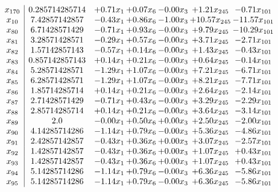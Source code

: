 \documentclass[8pt]{article}
\begin{document}
\[\begin{array}{c| c c@{\hskip 2pt} c@{\hskip 2pt} c@{\hskip 2pt} c@{\hskip 2pt} c@{\hskip 2pt} }
 x_{170}   &  0.285714285714 & +  0.71 x_{1} & +  0.07 x_{6} & -0.00 x_{3} & +  1.21 x_{245} & -0.71 x_{101}\\
 x_{10}   &  7.42857142857 & -0.43 x_{1} & +  0.86 x_{6} & -1.00 x_{3} & + 10.57 x_{245} & -11.57 x_{101}\\
 x_{80}   &  6.71428571429 & -0.71 x_{1} & +  0.93 x_{6} & -0.00 x_{3} & +  9.79 x_{245} & -10.29 x_{101}\\
 x_{81}   &  3.28571428571 & -0.29 x_{1} & +  0.57 x_{6} & -0.00 x_{3} & +  3.71 x_{245} & -2.71 x_{101}\\
 x_{82}   &  1.57142857143 & -0.57 x_{1} & +  0.14 x_{6} & -0.00 x_{3} & +  1.43 x_{245} & -0.43 x_{101}\\
 x_{83}   &  0.857142857143 & +  0.14 x_{1} & +  0.21 x_{6} & -0.00 x_{3} & +  0.64 x_{245} & -0.14 x_{101}\\
 x_{84}   &  5.28571428571 & -1.29 x_{1} & +  1.07 x_{6} & -0.00 x_{3} & +  7.21 x_{245} & -6.71 x_{101}\\
 x_{85}   &  6.28571428571 & -1.29 x_{1} & +  1.07 x_{6} & -0.00 x_{3} & +  8.21 x_{245} & -7.71 x_{101}\\
 x_{86}   &  1.85714285714 & +  0.14 x_{1} & +  0.21 x_{6} & -0.00 x_{3} & +  2.64 x_{245} & -2.14 x_{101}\\
 x_{87}   &  2.71428571429 & -0.71 x_{1} & +  0.43 x_{6} & -0.00 x_{3} & +  3.29 x_{245} & -2.29 x_{101}\\
 x_{88}   &  2.85714285714 & +  0.14 x_{1} & +  0.21 x_{6} & -0.00 x_{3} & +  3.64 x_{245} & -3.14 x_{101}\\
 x_{89}   &  2.0 & -0.00 x_{1} & +  0.50 x_{6} & +  0.00 x_{3} & +  2.50 x_{245} & -2.00 x_{101}\\
 x_{90}   &  4.14285714286 & -1.14 x_{1} & +  0.79 x_{6} & -0.00 x_{3} & +  5.36 x_{245} & -4.86 x_{101}\\
 x_{91}   &  2.42857142857 & -0.43 x_{1} & +  0.36 x_{6} & +  0.00 x_{3} & +  3.07 x_{245} & -2.57 x_{101}\\
 x_{92}   &  1.42857142857 & -0.43 x_{1} & +  0.36 x_{6} & +  0.00 x_{3} & +  1.07 x_{245} & +  0.43 x_{101}\\
 x_{93}   &  1.42857142857 & -0.43 x_{1} & +  0.36 x_{6} & +  0.00 x_{3} & +  1.07 x_{245} & +  0.43 x_{101}\\
 x_{94}   &  5.14285714286 & -1.14 x_{1} & +  0.79 x_{6} & -0.00 x_{3} & +  6.36 x_{245} & -5.86 x_{101}\\
 x_{95}   &  5.14285714286 & -1.14 x_{1} & +  0.79 x_{6} & -0.00 x_{3} & +  6.36 x_{245} & -5.86 x_{101}\\

\end{array}\]
\end{document}
